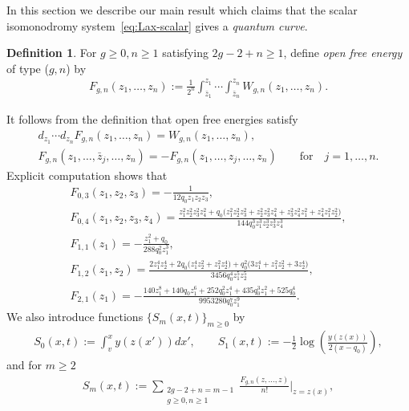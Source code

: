 \documentclass[11pt]{article}
\theoremstyle{definition}
\newtheorem{Def}[thm]{Definition}
\numberwithin{equation}{section}
\begin{document}
In this section we describe our main result which claims
that the scalar isomonodromy system~\eqref{eq:Lax-scalar}
gives a {\em quantum curve}.

\begin{Def}
For $g \ge 0, n \ge 1$ satisfying $2g-2+n \ge 1$,
def\/ine {\em open free energy} of type ($g,n$) by
\begin{gather} \label{eq:open-Fgn}
F_{g,n}(z_{1},\dots,z_{n}) :=
\frac{1}{2^{n}} \int^{z_{1}}_{\bar{z}_{1}}\cdots
\int^{z_{n}}_{\bar{z}_{n}} W_{g,n}(z_{1},\dots,z_{n}).
\end{gather}
\end{Def}

It follows from the def\/inition that open free energies satisfy
\begin{gather*}
d_{z_{1}}\cdots d_{z_{n}} F_{g,n}(z_{1},\dots,z_{n})   =
W_{g,n}(z_{1},\dots,z_{n}), \\
F_{g,n}(z_{1},\dots,\bar{z}_{j}, \dots,z_{n})   =
- F_{g,n}(z_{1},\dots, z_{j}, \dots,z_{n})
\qquad \text{for} \quad j=1,\dots,n.
\end{gather*}
Explicit computation shows that
\begin{gather*}
F_{0,3}(z_{1},z_{2},z_{3})   =   -\frac{1}{12q_{0}z_{1}z_{2}z_{3}}, \\
F_{0,4}(z_{1},z_{2},z_{3},z_{4})   =
\frac{z_{1}^{2}z_{2}^{2}z_{3}^{2}z_{4}^{2} + q_{0}\bigl(
z_{1}^{2}z_{2}^{2}z_{3}^{2} + z_{2}^{2}z_{3}^{2}z_{4}^{2} +
z_{3}^{2}z_{4}^{2}z_{1}^{2} + z_{4}^{2}z_{1}^{2}z_{2}^{2} \bigr)}
{144q_{0}^{3}z_{1}^{3}z_{2}^{3}z_{3}^{3}z_{4}^{3}},
\\
F_{1,1}(z_{1})  =  -\frac{z_{1}^{2}+q_{0}}{288q_{0}^{2} z_{1}^{3}}, \\
%
F_{1,2}(z_{1},z_{2}) =
\frac{2z_{1}^{4}z_{2}^{4} +
2q_{0}\bigl( z_{1}^{4}z_{2}^{2} + z_{1}^{2}z_{2}^{4} \bigr) +
q_{0}^{2}\bigl( 3z_{1}^{4} + z_{1}^{2}z_{2}^{2} + 3z_{2}^{4} \bigr)}
{3456q_{0}^{4}z_{1}^{5}z_{2}^{5}}, \\
%
F_{2,1}(z_{1})  =
-\frac{140z_{1}^{8} + 140 q_{0} z_{1}^6 + 252 q_{0}^{2} z_{1}^4
+ 435 q_{0}^{3} z_{1}^2 + 525 q_{0}^{4}}
{9953280 q_{0}^{7} z_{1}^{9}}.
\end{gather*}
We also introduce functions $\{ S_{m}(x,t) \}_{m \ge 0}$ by
\begin{gather*} %
S_{0}(x,t) := \int^{x}_{v} y(z(x'))dx', \qquad
S_{1}(x,t) := -\frac{1}{2} \log \left(\frac{y(z(x))}{2(x-q_{0})}
\right),
\end{gather*}
and for $m \ge 2$
\begin{gather*} %
S_{m}(x,t) := \sum_{\substack{2g-2+n=m-1 \\ g\ge0, n\ge 1}}
\frac{F_{g,n}(z,\dots,z)}{n!} \biggr|_{z=z(x)},
\end{gather*}
\end{document}
